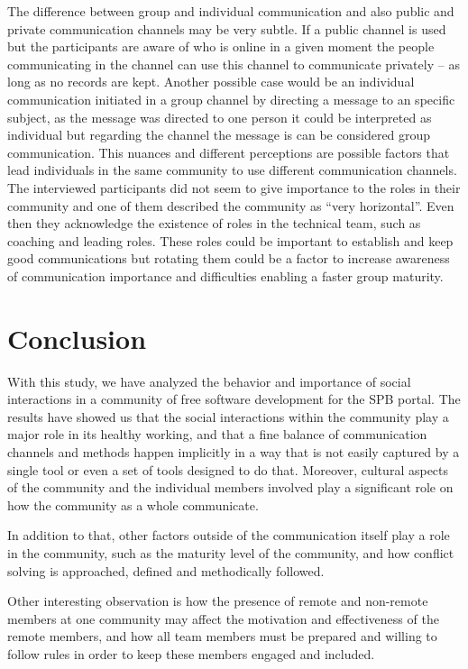 \documentclass{sigchi}
\begin{document}
The difference between group and individual communication and also public and private communication channels may be very subtle. If a public channel is used but the participants are aware of who is online in a given moment the people communicating in the channel can use this channel to communicate privately – as long as no records are kept. Another possible case would be an individual communication initiated in a group channel by directing a message to an specific subject, as the message was directed to one person it could be interpreted as individual but regarding the channel the message is can be considered group communication. This nuances and different perceptions are possible factors that lead individuals in the same community to use different communication channels. 
The interviewed participants did not seem to give importance to the roles in their community and one of them described the community as ``very horizontal''. Even then they acknowledge the existence of roles in the technical team, such as coaching and leading roles. These roles could be important to establish and keep good communications but rotating them could be a factor to increase awareness of communication importance and difficulties enabling a faster group maturity.

\section{Conclusion}

With this study, we have analyzed the behavior and importance of social interactions in a community of free software development for the SPB portal. The results have showed us that the social interactions within the community play a major role in its healthy working, and that a fine balance of communication channels and methods happen implicitly in a way that is not easily captured by a single tool or even a set of tools designed to do that. Moreover, cultural aspects of the community and the individual members involved play a significant role on how the community as a whole communicate.

In addition to that, other factors outside of the communication itself play a role in the community, such as the maturity level of the community, and how conflict solving is approached, defined and methodically followed.

Other interesting observation is how the presence of remote and non-remote members at one community may affect the motivation and effectiveness of the remote members, and how all team members must be prepared and willing to follow rules in order to keep these members engaged and included.
\end{document}
